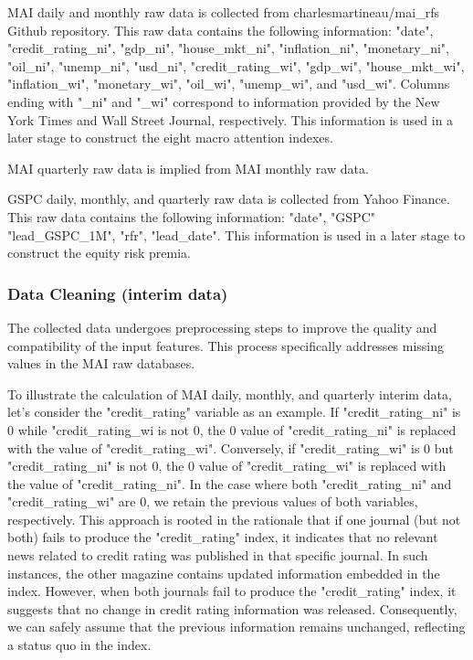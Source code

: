 \documentclass{article}
\begin{document}
MAI daily and monthly raw data is collected from charlesmartineau/mai\_rfs Github repository. This raw data contains the following information: "date", "credit\_rating\_ni", "gdp\_ni", "house\_mkt\_ni", "inflation\_ni", "monetary\_ni", "oil\_ni", "unemp\_ni", "usd\_ni", "credit\_rating\_wi", "gdp\_wi", "house\_mkt\_wi", "inflation\_wi", "monetary\_wi", "oil\_wi", "unemp\_wi", and "usd\_wi". Columns ending with "\_ni" and "\_wi" correspond to information provided by the New York Times and Wall Street Journal, respectively. This information is used in a later stage to construct the eight macro attention indexes.

MAI quarterly raw data is implied from MAI monthly raw data.

GSPC daily, monthly, and quarterly raw data is collected from Yahoo Finance. This raw data contains the following information: "date", "GSPC"	"lead\_GSPC\_1M", "rfr", "lead\_date". This information is used in a later stage to construct the equity risk premia.

\subsubsection{Data Cleaning (interim data)}

The collected data undergoes preprocessing steps to improve the quality and compatibility of the input features. This process specifically addresses missing values in the MAI raw databases.

To illustrate the calculation of MAI daily, monthly, and quarterly interim data, let's consider the "credit\_rating" variable as an example. If "credit\_rating\_ni" is $0$ while "credit\_rating\_wi is not $0$, the $0$ value of "credit\_rating\_ni" is replaced with the value of "credit\_rating\_wi". Conversely, if "credit\_rating\_wi" is $0$ but "credit\_rating\_ni" is not $0$, the $0$ value of "credit\_rating\_wi" is replaced with the value of "credit\_rating\_ni". In the case where both "credit\_rating\_ni" and "credit\_rating\_wi" are $0$, we retain the previous values of both variables, respectively. This approach is rooted in the rationale that if one journal (but not both) fails to produce the "credit\_rating" index, it indicates that no relevant news related to credit rating was published in that specific journal. In such instances, the other magazine contains updated information embedded in the index. However, when both journals fail to produce the "credit\_rating" index, it suggests that no change in credit rating information was released. Consequently, we can safely assume that the previous information remains unchanged, reflecting a status quo in the index.
\end{document}
